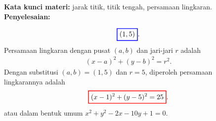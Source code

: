\documentclass[10pt,openany,a4paper]{article}
\theoremstyle{definition}
\theoremstyle{definition}
\theoremstyle{plain}
\newenvironment{jawab}[2][tes]{%
\par\noindent\textbf{Kata kunci materi:} #1.\\
\textbf{Penyelesaian:} #2%
}{}
\begin{document}
\begin{enumerate}
\begin{jawab}[jarak titik, titik tengah, persamaan lingkaran]
{\begin{enumerate}
\begin{align*}
        \color{blue}
        \setlength{\fboxrule}{1pt} \boxed{\color{oldcolor}(1,5)}\color{oldcolor}.
            \end{align*}
            Persamaan lingkaran dengan pusat $(a,b)$ dan jari-jari $r$ adalah
            \begin{align*}
                (x-a)^2 + (y-b)^2 = r^2.
            \end{align*}
            Dengan substitusi $(a,b)=(1,5)$ dan $r=5$, diperoleh persamaan lingkarannya adalah
            $$\colorlet{oldcolor}{.}
        \color{red}
        \setlength{\fboxrule}{1pt} \boxed{\color{oldcolor}(x-1)^2 + (y-5)^2 = 25}\color{oldcolor}.$$
            atau dalam bentuk umum $x^2+y^2-2x-10y+1=0$.
        \end{enumerate}
    }
    \end{jawab}


\end{enumerate}
\end{document}
